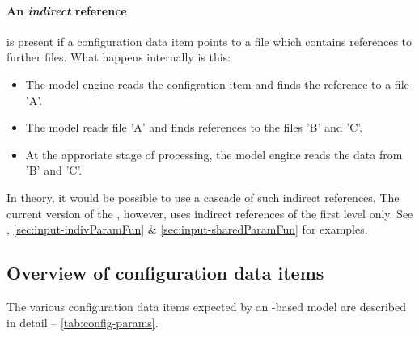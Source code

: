 \paragraph{An \emph{indirect} reference} is present if a configuration data item points to a file which contains references to further files. What happens internally is this:
\begin{itemize}
  \item The model engine reads the configration item and finds the reference to a file 'A'.
  \item The model reads file 'A' and finds references to the files 'B' and 'C'.
  \item At the approriate stage of processing, the model engine reads the data from 'B' and 'C'.
\end{itemize}

In theory, it would be possible to use a cascade of such indirect references. The current version of the , however, uses indirect references of the first level only. See , \ref{sec:input-indivParamFun} \& \ref{sec:input-sharedParamFun} for examples.

\subsection{Overview of configuration data items} \label{sec:input-config-items}
The various configuration data items expected by an -based model are described in detail  -- \ref{tab:config-params}.

